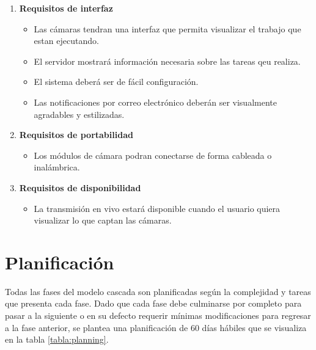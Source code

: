 \begin{enumerate}
    \item  \textbf{Requisitos de interfaz} 
        \begin{itemize}
            \item Las cámaras tendran una interfaz que permita visualizar el trabajo que estan ejecutando.
            \item El servidor mostrará información necesaria sobre las tareas qeu realiza.
            \item El sistema deberá ser de fácil configuración.
            \item Las notificaciones por correo electrónico deberán ser visualmente agradables y estilizadas.
        \end{itemize}
    \item \textbf{Requisitos de portabilidad}
        \begin{itemize}
            \item Los módulos de cámara podran conectarse de forma cableada o inalámbrica.
        \end{itemize}
    \item \textbf{Requisitos de disponibilidad}
        \begin{itemize}
            \item La transmisión en vivo estará disponible cuando el usuario quiera visualizar lo que captan las cámaras.
        \end{itemize}
\end{enumerate}

\section{Planificación}
Todas las fases del modelo cascada son planificadas según la complejidad y tareas que presenta cada fase. Dado que cada fase debe culminarse por completo para pasar a la siguiente o en su defecto requerir mínimas modificaciones para regresar a la fase anterior, se plantea una planificación de 60 días hábiles que se visualiza en la tabla \ref{tabla:planning}.\\

